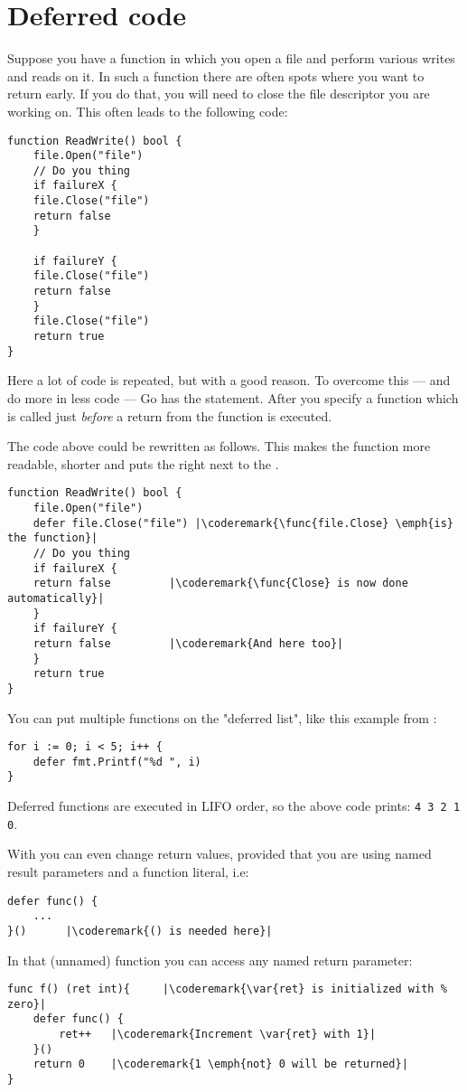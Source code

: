 \section{Deferred code}
Suppose you have a function in which you open a file and perform various
writes and reads on it. In such a function there are often spots where
you want to return early. If you do that, you will need to close the file
descriptor you are working on. This often leads to the following code:
\begin{lstlisting}[caption=Without \func{defer}]
function ReadWrite() bool {
    file.Open("file")
    // Do you thing
    if failureX {
	file.Close("file")
	return false
    }

    if failureY {
	file.Close("file")
	return false
    }
    file.Close("file")
    return true
}
\end{lstlisting}
Here a lot of code is repeated, but with a good reason. To overcome this ---
and do more in less code --- Go has the  statement. After
 you specify a function which is called just \emph{before} a
return from the function is executed.

The code above could be rewritten as follows. This makes the 
function more readable, shorter and puts the  right next 
to the .
\begin{lstlisting}[caption=With \func{defer}]
function ReadWrite() bool {
    file.Open("file")
    defer file.Close("file") |\coderemark{\func{file.Close} \emph{is} the function}|
    // Do you thing
    if failureX {
	return false	     |\coderemark{\func{Close} is now done automatically}|
    }
    if failureY {
	return false	     |\coderemark{And here too}|
    }
    return true
}
\end{lstlisting}
You can put multiple functions on the "deferred list", like this
example from \cite{effective_go}:
\begin{lstlisting}
for i := 0; i < 5; i++ { 
    defer fmt.Printf("%d ", i) 
} 
\end{lstlisting}
Deferred functions are executed in LIFO order, so the above code
prints: \lstinline{4 3 2 1 0}. 

With  you can even change return values, provided that
you are using named result parameters and a function literal, i.e:
\begin{lstlisting}[caption=Function literal]
defer func() {
	...
}()		 |\coderemark{() is needed here}|
\end{lstlisting}
In that (unnamed) function you can access any named return
parameter:
\begin{lstlisting}[caption=Access return values within \func{defer}]
func f() (ret int){     |\coderemark{\var{ret} is initialized with %
zero}|
	defer func() {
		ret++	|\coderemark{Increment \var{ret} with 1}|
	}()
	return 0	|\coderemark{1 \emph{not} 0 will be returned}|
}
\end{lstlisting}


